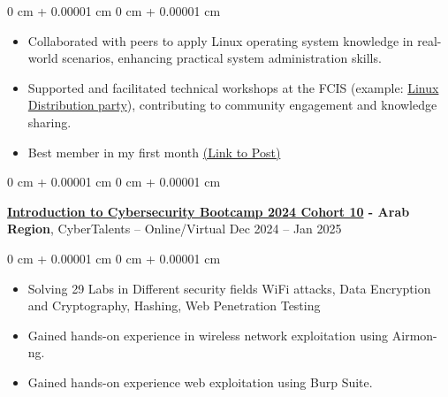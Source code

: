\documentclass[10pt, letterpaper]{article}
\newenvironment{highlights}{
    \begin{itemize}[
        topsep=0.10 cm,
        parsep=0.10 cm,
        partopsep=0pt,
        itemsep=0pt,
        leftmargin=0 cm + 10pt
    ]
}{
    \end{itemize}
} %
\newenvironment{onecolentry}{
    \begin{adjustwidth}{
        0 cm + 0.00001 cm
    }{
        0 cm + 0.00001 cm
    }
}{
    \end{adjustwidth}
} %
\newenvironment{twocolentry}[2][]{
    \onecolentry
    \def\secondColumn{#2}
    \setcolumnwidth{\fill, 4.5 cm}
    \begin{paracol}{2}
}{
    \switchcolumn \raggedleft \secondColumn
    \end{paracol}
    \endonecolentry
} %
\begin{document}
        \vspace{0.10 cm}
        \begin{onecolentry}
            \begin{highlights}
                \item Collaborated with peers to apply Linux operating system knowledge in real-world scenarios, enhancing practical system administration skills.
                
                \item Supported and facilitated technical workshops at the FCIS (example:   \href{https://www.linkedin.com/posts/samir176520_linux-kali-arch-activity-7302488001924730880-E62j/}{Linux Distribution party}), contributing to community engagement and knowledge sharing.
                \item Best member in my first month \href{https://www.linkedin.com/posts/samir176520_osc-dontabrreinventabrtheabrwheel-aeaaeraepaerabraepaesaehaesaetabraesaehaesaeyaetaev-activity-7275305683783176193-mQQi?}{(Link to Post)} \end{highlights} \end{onecolentry}


        \vspace{0.2 cm}

        \begin{twocolentry}{
            Dec 2024 – Jan 2025
        }
            \textbf{\href{https://cybertalents.com/learn/introduction-to-cybersecurity-bootcamp-cohort-10/units/cybertalents-certified-cybersecurity-practitioner-v2/}{Introduction to Cybersecurity Bootcamp 2024 Cohort 10} - Arab Region}, CyberTalents -- Online/Virtual \end{twocolentry}

        \vspace{0.10 cm}
        \begin{onecolentry}
            \begin{highlights}
                \item Solving 29 Labs in Different security fields WiFi attacks, Data Encryption and Cryptography, Hashing, Web Penetration Testing
                \item Gained hands-on experience in wireless network exploitation using Airmon-ng.
                \item Gained hands-on experience web exploitation using Burp Suite.
            \end{highlights}
        \end{onecolentry}
\end{document}
